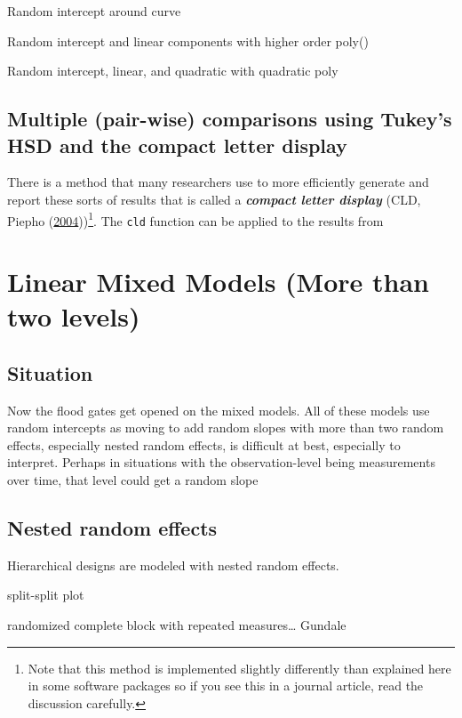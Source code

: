 \documentclass[
]{book}
\begin{document}
Random intercept around curve

Random intercept and linear components with higher order poly()

Random intercept, linear, and quadratic with quadratic poly

\hypertarget{section7-10}{%
\section{Multiple (pair-wise) comparisons using Tukey's HSD and the compact letter display}\label{section7-10}}

\indent There is a method that many researchers use to more efficiently generate and
report these sorts of results that is called a \textbf{\emph{compact letter display}} 
(CLD, Piepho (\protect\hyperlink{ref-Piepho2004}{2004}))\footnote{Note that this method is implemented slightly differently than explained here in some software packages so if you see this in a journal article, read the discussion carefully.}. The \texttt{cld} function can be applied to the results from

\hypertarget{chapter8}{%
\chapter{Linear Mixed Models (More than two levels)}\label{chapter8}}

\hypertarget{section8-1}{%
\section{Situation}\label{section8-1}}

Now the flood gates get opened on the mixed models. All of these models use random intercepts as moving to add random slopes with more than two random effects, especially nested random effects, is difficult at best, especially to interpret. Perhaps in situations with the observation-level being measurements over time, that level could get a random slope

\hypertarget{section8-2}{%
\section{Nested random effects}\label{section8-2}}

Hierarchical designs are modeled with nested random effects.

split-split plot

randomized complete block with repeated measures\ldots{} Gundale
\end{document}
